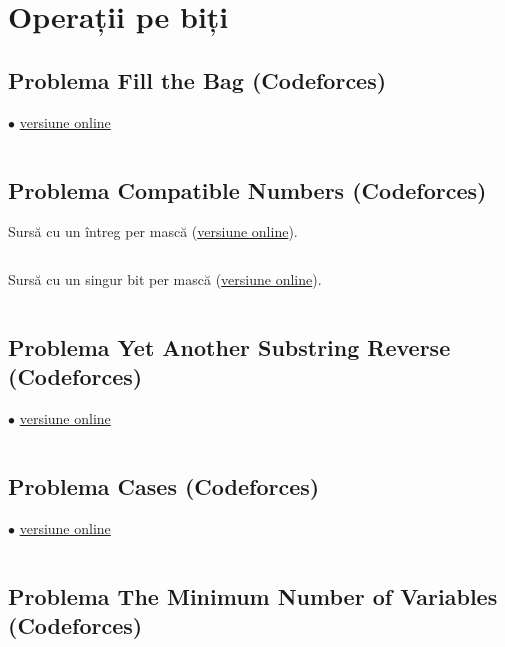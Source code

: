 \documentclass[../main.tex]{subfiles}
\begin{document}
\chapter{Operații pe biți}

\section{Problema Fill the Bag (Codeforces)}
\label{code:fill-the-bag}
$\bullet$
\href{https://codeforces.com/contest/1303/submission/290110222}{versiune online}

\inputminted{cpp}{../src/bit-mastery/fill-the-bag.cpp}

\section{Problema Compatible Numbers (Codeforces)}
\label{code:compatible-numbers}

Sursă cu un întreg per mască (\href{https://codeforces.com/contest/165/submission/291199032}{versiune online}).

\inputminted{cpp}{../src/bit-mastery/compatible-numbers-1.cpp}

Sursă cu un singur bit per mască (\href{https://codeforces.com/contest/165/submission/291200763}{versiune online}).

\inputminted{cpp}{../src/bit-mastery/compatible-numbers-2.cpp}

\section{Problema Yet Another Substring Reverse (Codeforces)}
\label{code:yet-another-substring-reverse}
$\bullet$
\href{https://codeforces.com/contest/1234/submission/290578099}{versiune online}

\inputminted{cpp}{../src/bit-mastery/yet-another-substring-reverse.cpp}

\section{Problema Cases (Codeforces)}
\label{code:cases}
$\bullet$
\href{https://codeforces.com/contest/1995/submission/349346094}{versiune online}

\inputminted{cpp}{../src/bit-mastery/cases.cpp}

\section{Problema The Minimum Number of Variables (Codeforces)}
\label{code:the-minimum-number-of-variables}
\end{document}
